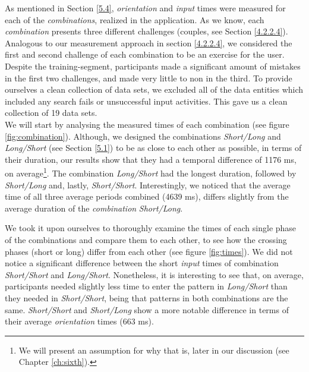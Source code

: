  As mentioned in Section \ref{5.4}, \textit{orientation} and \textit{input} times were measured for each of the \textit{combinations}, realized in the application. As we know, each \textit{combination} presents three different challenges (couples, see Section \ref{4.2.2.4}). Analogous to our measurement approach in section \ref{4.2.2.4}, we considered the first and second challenge of each combination to be an exercise for the user. Despite the training-segment, participants made a significant amount of mistakes in the first two challenges, and made very little to non in the third. To provide ourselves a clean collection of data sets, we excluded all of the data entities which included any search fails or unsuccessful input activities. This gave us a clean collection of 19 data sets. \\

We will start by analysing the measured times of each combination (see figure \ref{fig:combination}). Although, we designed the combinations \textit{Short/Long} and \textit{Long/Short} (see Section \ref{5.1}) to be as close to each other as possible, in terms of their duration, our results show that they had a temporal difference of 1176 ms, on average\footnote{We will present an assumption for why that is, later in our discussion (see Chapter \ref{ch:sixth}).}. The combination \textit{Long/Short} had the longest duration, followed by \textit{Short/Long} and, lastly, \textit{Short/Short}.  Interestingly, we noticed that the average time of all three average periods combined (4639 ms), differs slightly from the average duration of the \textit{combination} \textit{Short/Long}. 

We took it upon ourselves to thoroughly examine the times of each single phase of the combinations and compare them to each other, to see how the crossing phases (short or long) differ from each other (see figure \ref{fig:times}). We did not notice a significant difference between the short \textit{input} times of combination \textit{Short/Short} and \textit{Long/Short}. Nonetheless, it is interesting to see that, on average, participants needed slightly less time to enter the pattern in \textit{Long/Short} than they needed in \textit{Short/Short}, being that patterns in both combinations are the same. \textit{Short/Short} and \textit{Short/Long} show a more notable difference in terms of their average \textit{orientation} times (663 ms). 


